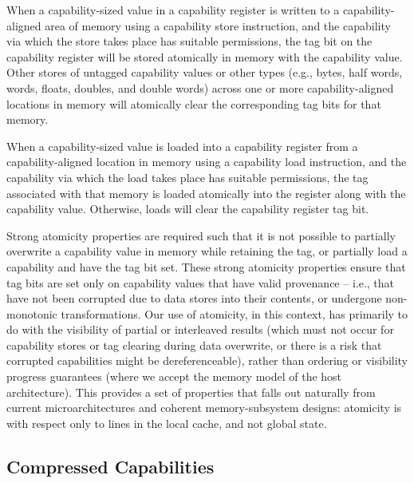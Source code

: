 When a capability-sized value in a capability register is written to a
capability-aligned area of memory using a capability store instruction, and
the capability via which the store takes place has suitable permissions, the
tag bit on the capability register will be stored atomically in memory with
the capability value.
Other stores of untagged capability values or other types (e.g., bytes, half
words, words, floats, doubles, and double words) across one or more
capability-aligned locations in memory will atomically clear the corresponding
tag bits for that memory.

When a capability-sized value is loaded into a capability register from a
capability-aligned location in memory using a capability load instruction, and
the capability via which the load takes place has suitable permissions, the
tag associated with that memory is loaded atomically into the register along
with the capability value.
Otherwise, loads will clear the capability register tag bit.

Strong atomicity properties are required such that it is not possible to
partially overwrite a capability value in memory while retaining the tag, or
partially load a capability and have the tag bit set.
These strong atomicity properties ensure that tag bits are set only on
capability values that have valid provenance -- i.e., that have not been
corrupted due to data stores into their contents, or undergone non-monotonic
transformations.
Our use of atomicity, in this context, has primarily to do with the visibility
of partial or interleaved results (which must not occur for capability stores
or tag clearing during data overwrite, or there is a risk that corrupted
capabilities might be dereferenceable), rather than ordering or visibility
progress guarantees (where we accept the memory model of the host
architecture).
This provides a set of properties that falls out naturally from current
microarchitectures and coherent memory-subsystem designs: atomicity is with
respect only to lines in the local cache, and not global state.

\subsection{Compressed Capabilities}
\label{compression}

